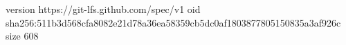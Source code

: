 version https://git-lfs.github.com/spec/v1
oid sha256:511b3d568cfa8082e21d78a36ea58359cb5dc0af1803877805150835a3af926c
size 608
